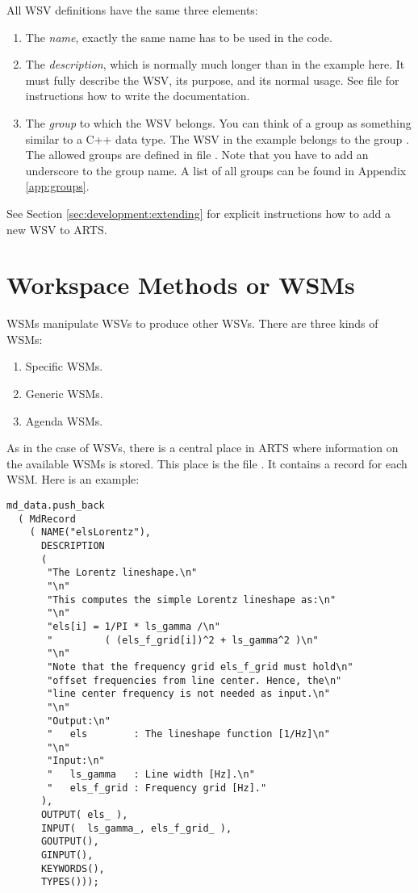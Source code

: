 \noindent
All WSV definitions have the same three elements:
\begin{enumerate}
\item The \emph{name}, exactly the
  same name has to be used in the code.
\item The \emph{description}, which is normally much longer than in
  the example here. It must fully describe the WSV, its purpose, and
  its normal usage. See file  for instructions
  how to write the documentation.
\item The \emph{group} to which the WSV belongs. You can think of a
  group as something similar to a C++ data type. The WSV in the
  example belongs to the group . The allowed groups
  are defined in file . Note that you have to add
  an underscore to the group name. A list of all groups can be found
  in Appendix \ref{app:groups}.
\end{enumerate}

\noindent
See Section \ref{sec:development:extending} for explicit
instructions how to add a new WSV to ARTS.

\section{Workspace Methods or WSMs}
\label{sec:agendas:wsms}

WSMs manipulate WSVs to produce other WSVs. There are three kinds of
WSMs:
\begin{enumerate}
\item Specific WSMs.
\item Generic WSMs.
\item Agenda WSMs.
\end{enumerate}
As in the case of WSVs, there is a central place in ARTS where
information on the available WSMs is stored. This place is the file
. It contains a record for each WSM. Here is an
example:

{\small
\begin{verbatim}
md_data.push_back
  ( MdRecord
    ( NAME("elsLorentz"),
      DESCRIPTION
      (
       "The Lorentz lineshape.\n"
       "\n"
       "This computes the simple Lorentz lineshape as:\n"
       "\n"
       "els[i] = 1/PI * ls_gamma /\n"
       "         ( (els_f_grid[i])^2 + ls_gamma^2 )\n"
       "\n"
       "Note that the frequency grid els_f_grid must hold\n"
       "offset frequencies from line center. Hence, the\n"
       "line center frequency is not needed as input.\n"
       "\n"
       "Output:\n"
       "   els        : The lineshape function [1/Hz]\n"
       "\n"
       "Input:\n"
       "   ls_gamma   : Line width [Hz].\n"
       "   els_f_grid : Frequency grid [Hz]."
      ),
      OUTPUT( els_ ),
      INPUT(  ls_gamma_, els_f_grid_ ),
      GOUTPUT(),
      GINPUT(),
      KEYWORDS(),
      TYPES()));
\end{verbatim}
}

